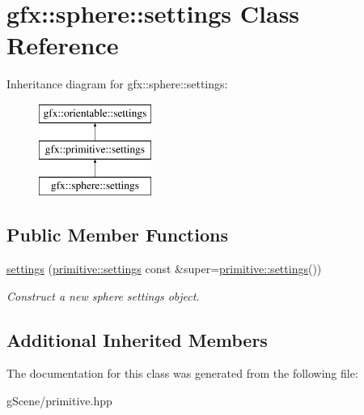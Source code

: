 \hypertarget{classgfx_1_1sphere_1_1settings}{\section{gfx\-:\-:sphere\-:\-:settings Class Reference}
\label{classgfx_1_1sphere_1_1settings}
}
Inheritance diagram for gfx\-:\-:sphere\-:\-:settings\-:\begin{figure}[H]
\begin{center}
\leavevmode
\includegraphics[height=3.000000cm]{classgfx_1_1sphere_1_1settings}
\end{center}
\end{figure}
\subsection*{Public Member Functions}
\begin{DoxyCompactItemize}
\item 
\hypertarget{classgfx_1_1sphere_1_1settings_a245bf16fe090c81e14e5fcda4b2a5d83}{\hyperlink{classgfx_1_1sphere_1_1settings_a245bf16fe090c81e14e5fcda4b2a5d83}{settings} (\hyperlink{classgfx_1_1primitive_1_1settings}{primitive\-::settings} const \&super=\hyperlink{classgfx_1_1primitive_1_1settings}{primitive\-::settings}())}\label{classgfx_1_1sphere_1_1settings_a245bf16fe090c81e14e5fcda4b2a5d83}

\begin{DoxyCompactList}\small\item\em Construct a new sphere settings object. \end{DoxyCompactList}\end{DoxyCompactItemize}
\subsection*{Additional Inherited Members}


The documentation for this class was generated from the following file\-:\begin{DoxyCompactItemize}
\item 
g\-Scene/primitive.\-hpp\end{DoxyCompactItemize}
